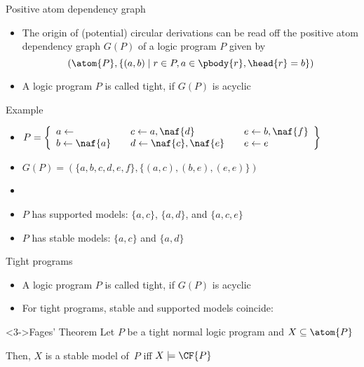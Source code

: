 \begin{frame}{Positive atom dependency graph}
  \bigskip
  \begin{itemize}
  \item<1->
    The origin of (potential) circular derivations can be read off the
    \alert{positive atom dependency graph} $G(P)$ of a logic program $P$
    given by
    \[
    (\atom{P}, \{(a,b) \mid r\in P, a \in \pbody{r}, \head{r}=b\})
    \]
  \item<2-> A logic program $P$ is called \alert{tight}, if $G(P)$ is acyclic
  \end{itemize}
\end{frame}
\begin{frame}[c]{Example}
  \bigskip
  \begin{itemize}
  \item<1->
  \(
  P
  =
  \left\{
    \begin{array}{lll}
      a \leftarrow                  \quad &
      c \leftarrow a, \naf{d}       \quad &
      e \leftarrow b, \naf{f}
      \\
      b \leftarrow \naf{a}          \quad &
      d \leftarrow \naf{c}, \naf{e} \quad &
      e \leftarrow e
    \end{array}
  \right\}
  \)
  \medskip
  \item<2->
    \(
    G(P)= (\{a,b,c,d,e,f\},\{(a,c),(b,e),(e,e)\})
    \)
  \item<3-> []
    \begin{center}
    
    \end{center}
  \item<4-> $P$ has supported models: $\{a,c\}$, $\{a,d\}$, and $\{a,c,e\}$
  \item<4-> $P$ has stable    models: $\{a,c\}$ and $\{a,d\}$
\end{itemize}
\end{frame}
\begin{frame}{Tight programs}
  \bigskip
  \begin{itemize}
  \item<1-> A logic program $P$ is called \alert{tight}, if $G(P)$ is acyclic
    \medskip
  \item<2-> For tight programs, stable and supported models coincide\pause[3]:
  \end{itemize}
  \bigskip
  \begin{block}<3->{Fages' Theorem}
    Let $P$ be a tight normal logic program and $X\subseteq\atom{P}$

    Then, $X$ is a stable model of~$P$ iff $X\models\CF{P}$
  \end{block}
\end{frame}
